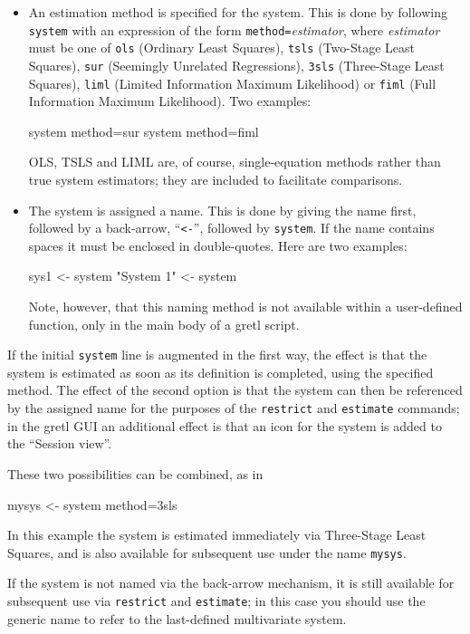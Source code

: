 \begin{itemize}
\item An estimation method is specified for the system. This is done
  by following \texttt{system} with an expression of the form
  \texttt{method=}\textsl{estimator}, where \textsl{estimator} must be
  one of \texttt{ols} (Ordinary Least Squares), \texttt{tsls}
  (Two-Stage Least Squares), \texttt{sur} (Seemingly Unrelated
  Regressions), \texttt{3sls} (Three-Stage Least Squares),
  \texttt{liml} (Limited Information Maximum Likelihood) or
  \texttt{fiml} (Full Information Maximum Likelihood). Two examples:
\begin{code}
system method=sur
system method=fiml
\end{code}
OLS, TSLS and LIML are, of course, single-equation methods rather than
true system estimators; they are included to facilitate comparisons.
\item The system is assigned a name. This is done by giving the name
  first, followed by a back-arrow, ``\verb|<-|'', followed by
  \texttt{system}.  If the name contains spaces it must be enclosed in
  double-quotes. Here are two examples:
\begin{code}
sys1 <- system
"System 1" <- system
\end{code}
Note, however, that this naming method is not available within a
user-defined function, only in the main body of a gretl script.
\end{itemize}

If the initial \texttt{system} line is augmented in the first way, the
effect is that the system is estimated as soon as its definition is
completed, using the specified method. The effect of the second option
is that the system can then be referenced by the assigned name for the
purposes of the \texttt{restrict} and \texttt{estimate} commands; in
the gretl GUI an additional effect is that an icon for the
system is added to the ``Session view''.

These two possibilities can be combined, as in
\begin{code}
mysys <- system method=3sls
\end{code}
In this example the system is estimated immediately via Three-Stage
Least Squares, and is also available for subsequent use under the
name \texttt{mysys}.

If the system is not named via the back-arrow mechanism, it is still
available for subsequent use via \texttt{restrict} and
\texttt{estimate}; in this case you should use the generic name
 to refer to the last-defined multivariate system.

